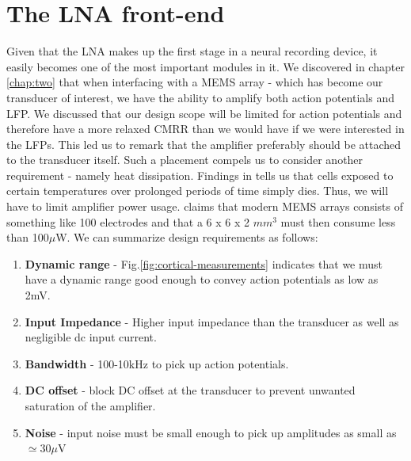 \chapter{The LNA front-end}
Given that the \acl{LNA} makes up the first stage in a neural recording device, it easily becomes one of the most important modules in it.  We discovered in chapter \ref{chap:two} that when interfacing with a \acs{MEMS} array - which has become our transducer of interest, we have the ability to amplify both action potentials and \acs{LFP}. We discussed that our design scope will be limited for action potentials and therefore have a more relaxed CMRR than we would have if we were interested in the LFPs. This led us to remark that the amplifier preferably should be attached to the transducer itself. Such a placement compels us to consider another requirement - namely heat dissipation. Findings in  \cite{seese1998characterization} tells us that cells exposed to certain temperatures over prolonged periods of time simply dies. Thus, we will have to limit amplifier power usage.  \cite{harrison2008design} claims that modern \acs{MEMS} arrays consists of something like 100 electrodes and that a 6 x 6 x 2 $mm^3$ must then consume less than 100$\mu$W. We can summarize design requirements as follows:

\begin{enumerate}
  \item\textbf{Dynamic range} - Fig.\ref{fig:cortical-measurements} indicates that we must have a dynamic range good enough to convey action potentials as low as \mp2mV.
  \item\textbf{Input Impedance} - Higher input impedance than the transducer as well as negligible dc input current.
  \item\textbf{Bandwidth} - 100-10kHz to pick up action potentials.
  \item\textbf{DC offset} - block DC offset at the transducer to prevent unwanted saturation of the amplifier.
  \item\textbf{Noise} - input noise must be small enough to pick up amplitudes as small as $\simeq$30$\mu$V
\end{enumerate}
